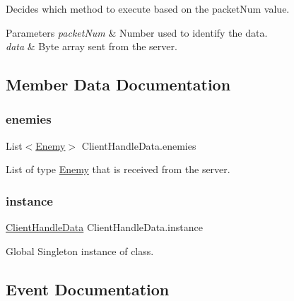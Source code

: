 Decides which method to execute based on the packet\+Num value. 


\begin{DoxyParams}{Parameters}
{\em packet\+Num} & Number used to identify the data.\\
\hline
{\em data} & Byte array sent from the server.\\
\hline
\end{DoxyParams}


\subsection{Member Data Documentation}
\mbox{\label{class_client_handle_data_a9c713b4e3487f59dd8298eb1184249b9}} 
\subsubsection{\texorpdfstring{enemies}{enemies}}
{\footnotesize\ttfamily List$<$\mbox{\hyperlink{class_enemy}{Enemy}}$>$ Client\+Handle\+Data.\+enemies}



List of type \mbox{\hyperlink{class_enemy}{Enemy}} that is received from the server. 

\mbox{\label{class_client_handle_data_a473fc5c804badc1de65ef3b0a4b74889}} 
\subsubsection{\texorpdfstring{instance}{instance}}
{\footnotesize\ttfamily \mbox{\hyperlink{class_client_handle_data}{Client\+Handle\+Data}} Client\+Handle\+Data.\+instance\hspace{0.3cm}{\ttfamily [static]}}



Global Singleton instance of class. 



\subsection{Event Documentation}
\mbox{\label{class_client_handle_data_ab147321855bab2a2d26b681d4f62869e}} 
